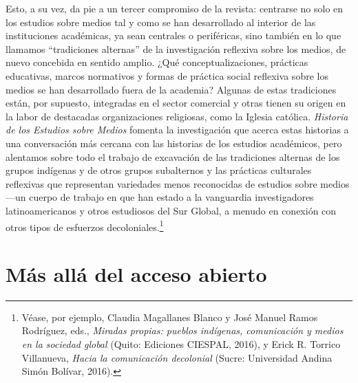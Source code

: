 \documentclass{tufte-handout}
\begin{document}
Esto, a su vez, da pie a un tercer compromiso de la revista: centrarse
no solo en los estudios sobre medios tal y como se han desarrollado al
interior de las instituciones académicas, ya sean centrales o
periféricas, sino también en lo que llamamos ``tradiciones alternas'' de
la investigación reflexiva sobre los medios, de nuevo concebida en
sentido amplio. ¿Qué conceptualizaciones, prácticas educativas, marcos
normativos y formas de práctica social reflexiva sobre los medios se han
desarrollado fuera de la academia? Algunas de estas tradiciones están,
por supuesto, integradas en el sector comercial y otras tienen su origen
en la labor de destacadas organizaciones religiosas, como la Iglesia
católica. \emph{Historia de los Estudios sobre Medios} fomenta la
investigación que acerca estas historias a una conversación más cercana
con las historias de los estudios académicos, pero alentamos sobre todo
el trabajo de excavación de las tradiciones alternas de los grupos
indígenas y de otros grupos subalternos y las prácticas culturales
reflexivas que representan variedades menos reconocidas de estudios
sobre medios ---un cuerpo de trabajo en que han estado a la vanguardia
investigadores latinoamericanos y otros estudiosos del Sur Global, a
menudo en conexión con otros tipos de esfuerzos decoloniales.\footnote{Véase,
  por ejemplo, Claudia Magallanes Blanco y José Manuel Ramos Rodríguez,
  eds., \emph{Miradas propias: pueblos indígenas, comunicación y medios
  en la sociedad global} (Quito: Ediciones CIESPAL, 2016), y Erick R.
  Torrico Villanueva, \emph{Hacia la comunicación decolonial} (Sucre:
  Universidad Andina Simón Bolívar, 2016).}

\hypertarget{muxe1s-alluxe1-del-acceso-abierto}{%
\section{Más allá del acceso
abierto}\label{muxe1s-alluxe1-del-acceso-abierto}}
\end{document}
